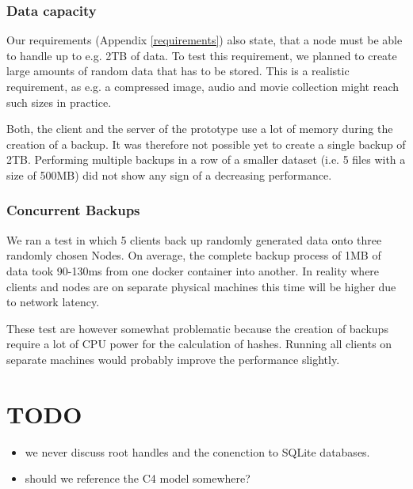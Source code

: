 \subsubsection{Data capacity}
Our requirements (Appendix \ref{requirements}) also state, that a node must be able to handle up to e.g. 2TB of data. To test this requirement, we planned to create large amounts of random data that has to be stored. This is a realistic requirement, as e.g. a compressed image, audio and movie collection might reach such sizes in practice.

Both, the client and the server of the prototype use a lot of memory during the creation of a backup. It was therefore not possible yet to create a single backup of 2TB. Performing multiple backups in a row of a smaller dataset (i.e. 5 files with a size of 500MB) did not show any sign of a decreasing performance.

\subsubsection{Concurrent Backups}

We ran a test in which 5 clients back up randomly generated data onto three randomly chosen Nodes. On average, the complete backup process of 1MB of data took 90-130ms from one docker container into another. In reality where clients and nodes are on separate physical machines this time will be higher due to network latency.

These test are however somewhat problematic because the creation of backups require a lot of CPU power for the calculation of hashes. Running all clients on separate machines would probably improve the performance slightly.



\section{TODO}

\begin{itemize}
	\item we never discuss root handles and the conenction to SQLite databases.
	\item should we reference the C4 model somewhere?
\end{itemize}